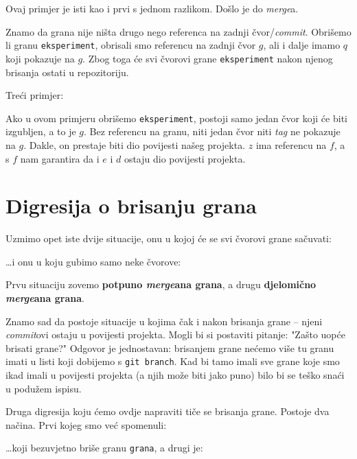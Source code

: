Ovaj primjer je isti kao i prvi s jednom razlikom. 
Došlo je do \emph{merge}a.

Znamo da grana nije ništa drugo nego referenca na zadnji čvor/\emph{commit}.
Obrišemo li granu \verb+eksperiment+, obrisali smo referencu na zadnji čvor $g$, ali i dalje imamo $q$ koji pokazuje na $g$.
Zbog toga će svi čvorovi grane \verb+eksperiment+ nakon njenog brisanja ostati u repozitoriju.

Treći primjer:



Ako u ovom primjeru obrišemo \verb+eksperiment+, postoji samo jedan čvor koji će biti izgubljen, a to je $g$.
Bez referencu na granu, niti jedan čvor niti \emph{tag} ne pokazuje na $g$. Dakle, on prestaje biti dio povijesti našeg projekta.
$z$ ima referencu na $f$, a s $f$ nam garantira da i $e$ i $d$ ostaju dio povijesti projekta.

\section*{Digresija o brisanju grana}

Uzmimo opet iste dvije situacije, onu u kojoj će se svi čvorovi grane sačuvati:



\dots{}i onu u koju gubimo samo neke čvorove:



Prvu situaciju zovemo \textbf{potpuno \emph{merge}ana grana}, a drugu \textbf{djelomično \emph{merge}ana grana}.

Znamo sad da postoje situacije u kojima čak i nakon brisanja grane -- njeni \emph{commit}ovi ostaju u povijesti projekta.
Mogli bi si postaviti pitanje: "Zašto uopće brisati grane?"
Odgovor je jednostavan:  brisanjem grane nećemo više tu granu imati u listi koji dobijemo s \verb+git branch+.
Kad bi tamo imali sve grane koje smo ikad imali u povijesti projekta (a njih može biti jako puno) bilo bi se teško snaći u podužem ispisu.

Druga digresija koju ćemo ovdje napraviti tiče se brisanja grane.
Postoje dva načina. Prvi kojeg smo već spomenuli:


\dots{}koji bezuvjetno briše granu \verb+grana+, a drugi je:

